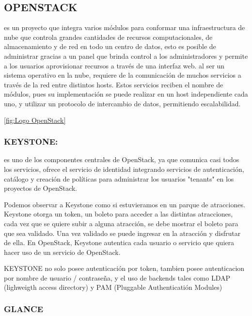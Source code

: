     \subsection{OPENSTACK}
    es un proyecto que integra varios módulos para conformar una infraestructura de nube que controla grandes cantidades de recursos computacionales, de almacenamiento y de red en todo un centro de datos, esto es posible de administrar  gracias a un panel que brinda control a los administradores y permite a los usuarios aprovisionar recursos a través de una interfaz web. al ser un sistema operativo en la nube, requiere de la comunicación de muchos servicios a través de la red entre distintos hosts. Estos servicios reciben el nombre de módulos, pues su implementación se puede realizar en un host independiente cada uno, y utilizar un protocolo de intercambio de datos, permitiendo escalabilidad.
    
  \ref{fig:Logo OpenStack}
  \label{openstackIMG}
  
    
  
    \subsubsection{KEYSTONE:}
    es uno de los componentes centrales de OpenStack, ya que comunica casi todos los servicios, ofrece el servicio de identidad integrando servicios de autenticación, catálogo y creación de políticas para administrar los usuarios "tenants" en los proyectos de OpenStack.
    
    Podemos observar a Keystone como si estuvieramos en un parque de atracciones. Keystone otorga un token, un boleto para acceder a las distintas atracciones, cada vez que se quiere subir a alguna atracción, se debe mostrar el boleto para que sea validado. Una vez validado se puede ingresar en la atracción y disfrutar de ella. En OpenStack, Keystone autentica cada usuario o servicio que quiera hacer uso de un servicio de OpenStack.
    
    KEYSTONE no solo posee autenticación por token, tambien posee autenticacion por nombre de usuario / contraseña, y  el uso de backends tales como LDAP (lighweigth access directory) y PAM (Pluggable Authenticatión Modules)
    
    \subsubsection{GLANCE}
    
